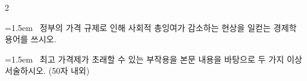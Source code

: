 \documentclass[10pt, a4paper]{article}
\begin{document}
\begin{multicols}{2}
\noindent\begin{minipage}{\columnwidth}
\vspace{2mm}
{\hangindent=1.5em  ~정부의 가격 규제로 인해 사회적 총잉여가 감소하는 현상을 일컫는 경제학 용어를 쓰시오.\par}

\vspace{3mm}
\noindent\hrulefill
\vspace{2.5mm}
\noindent\hrulefill
\vspace{2.5mm}
\noindent\hrulefill
\vspace{2.5mm}
\noindent\hrulefill
\vspace{2.5mm}
\noindent\hrulefill
\vspace{2.5mm}
\vspace{1mm}
\vspace{4mm}
\end{minipage}
\par

\noindent\begin{minipage}{\columnwidth}
\vspace{2mm}
{\hangindent=1.5em  ~최고 가격제가 초래할 수 있는 부작용을 본문 내용을 바탕으로 두 가지 이상 서술하시오. (50자 내외)\par}

\vspace{3mm}
\noindent\hrulefill
\vspace{2.5mm}
\noindent\hrulefill
\vspace{2.5mm}
\noindent\hrulefill
\vspace{2.5mm}
\noindent\hrulefill
\vspace{2.5mm}
\noindent\hrulefill
\vspace{2.5mm}
\vspace{1mm}
\vspace{4mm}
\end{minipage}
\par


\vspace{1mm}
\vspace{0.5mm}


\end{multicols}
\end{document}
